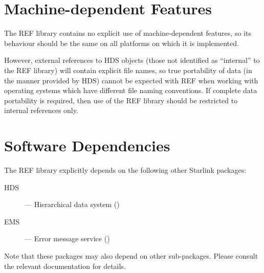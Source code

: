 \documentclass[twoside,11pt,nolof]{starlink}
\begin{document}
\section{Machine-dependent Features}
\label{machinedependent_features}

The REF library contains no explicit use of machine-dependent features,
so its behaviour should be the same on all platforms on which it is
implemented.

However, external references to HDS objects (those not identified as
``internal'' to the REF library) will contain explicit file names, so
true portability of data (in the manner provided by HDS) cannot be
expected with REF when working with operating systems which have
different file naming conventions. If complete data portability is
required, then use of the REF library should be restricted to internal
references only.

\section{Software Dependencies}
\label{software_dependencies}

The REF library explicitly depends on the following other Starlink packages:

\begin{description}
\item [HDS] --- Hierarchical data system ()
\item [EMS] --- Error message service ()
\end{description}

Note that these packages may also depend on other sub-packages. Please
consult the relevant documentation for details.

\end{document}
